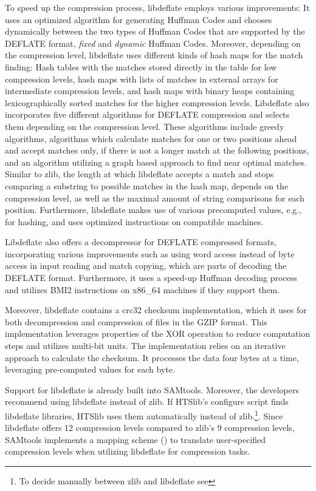 To speed up the compression process, libdeflate employs various improvements: It uses an optimized algorithm for generating Huffman Codes and chooses dynamically between the two types of Huffman Codes that are supported by the DEFLATE format, \textit{fixed} and \textit{dynamic} Huffman Codes. Moreover, depending on the compression level, libdeflate uses different kinds of hash maps for the match finding: Hash tables with the matches stored directly in the table for low compression levels, hash maps with lists of matches in external arrays for intermediate compression levels, and hash maps with binary heaps containing lexicographically sorted matches for the higher compression levels. Libdeflate also incorporates five different algorithms for DEFLATE compression and selects them depending on the compression level. These algorithms include greedy algorithms, algorithms which calculate matches for one or two positions ahead and accept matches only, if there is not a longer match at the following positions, and an algorithm utilizing a graph based approach to find near optimal matches. Similar to zlib, the length at which libdeflate accepts a match and stops comparing a substring to possible matches in the hash map, depends on the compression level, as well as the maximal amount of string comparisons for each position. Furthermore, libdeflate makes use of various precomputed values, e.g., for hashing, and uses optimized instructions on compatible machines.

Libdeflate also offers a decompressor for DEFLATE compressed formats, incorporating various improvements such as using word access instead of byte access in input reading and match copying, which are parts of decoding the DEFLATE format. Furthermore, it uses a speed-up Huffman decoding process and utilizes BMI2 instructions on x86\_64 machines if they support them.

Moreover, libdeflate contains a crc32 checksum implementation, which it uses for both decompression and compression of files in the GZIP format. This implementation leverages properties of the XOR operation to reduce computation steps and utilizes multi-bit units. The implementation relies on an iterative approach to calculate the checksum. It processes the data four bytes at a time, leveraging pre-computed values for each byte.

Support for libdeflate is already built into SAMtools. Moreover, the developers recommend using libdeflate instead of zlib. If HTSlib's configure script finds libdeflate libraries, HTSlib uses them automatically instead of zlib.\footnote{To decide manually between zlib and libdeflate see }. Since libdeflate offers 12 compression levels compared to zlib's 9 compression levels, SAMtools implements a mapping scheme () to translate user-specified compression levels when utilizing libdeflate for compression tasks.


